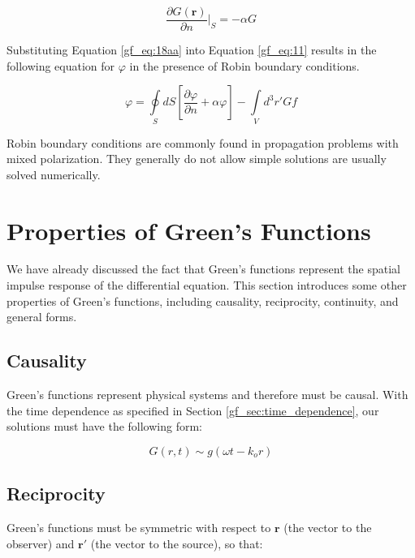 \begin{equation}
\frac{\partial G\left(\mathbf{r}\right)}{\partial n}\bigg|_{S} = -\alpha G
\label{gf_eq:18aa}
\end{equation}
\renewcommand{\baselinestretch}{2} \small\normalsize

Substituting Equation \ref{gf_eq:18aa} into Equation \ref{gf_eq:11} results in the following equation for $\varphi$ in the presence of Robin boundary conditions.

\begin{equation}
\boxed{\varphi = \oint\limits_{S}dS\left[\frac{\partial \varphi}{\partial n} + \alpha\varphi \right] -\int\limits_{V}d^3r' Gf}
\label{gf_eq:18aabb}
\end{equation}
\renewcommand{\baselinestretch}{2} \small\normalsize

Robin boundary conditions are commonly found in propagation problems with mixed polarization. They generally do not allow simple solutions are usually solved numerically.

\section {Properties of Green's Functions} \label{gf_sec:properties}
We have already discussed the fact that Green's functions represent the spatial impulse response of the differential equation. This section introduces some other properties of Green's functions, including causality, reciprocity, continuity, and general forms.

\subsection {Causality} \label{gf_sec:causality}
Green’s functions represent physical systems and therefore must be causal. With the time dependence as specified in Section \ref{gf_sec:time_dependence}, our solutions must have the following form:

\begin{equation}
G\left(r,t\right) \sim g\left(\omega t - k_or\right)
\label{gf_eq:18a}
\end{equation}
\renewcommand{\baselinestretch}{2} \small\normalsize

\subsection {Reciprocity} \label{gf_sec:reciprocity}
Green's functions must be symmetric with respect to $\mathbf{r}$ (the vector to the observer) and $\mathbf{r}'$ (the vector to the source), so that:


